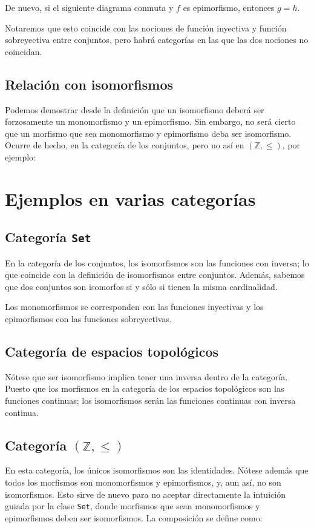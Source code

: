 \documentclass[11pt, fleqn, spanish]{book}
\begin{document}
De nuevo, si el siguiente diagrama conmuta y $f$ es epimorfismo, entonces $g=h$.

\begin{center}
\end{center}

Notaremos que esto coincide con las nociones de función inyectiva y
función sobreyectiva entre conjuntos, pero habrá categorías en las que
las dos nociones no coincidan.

\subsection{Relación con isomorfismos}
Podemos demostrar desde la definición que un isomorfismo deberá ser
forzosamente un monomorfismo y un epimorfismo. Sin embargo, no será
cierto que un morfismo que sea monomorfismo y epimorfismo deba ser
isomorfismo. Ocurre de hecho, en la categoría de los conjuntos,
pero no así en $(\mathbb{Z},\leq)$, por ejemplo:


\section {Ejemplos en varias categorías}
\subsection{Categoría \texttt{Set}}
En la categoría de los conjuntos, los isomorfismos son las funciones
con inversa; lo que coincide con la definición de isomorfismos entre
conjuntos. Además, sabemos que dos conjuntos son isomorfos si y sólo
si tienen la misma cardinalidad.

Los monomorfismos se corresponden con las funciones
inyectivas y los epimorfismos con las funciones sobreyectivas.

\subsection{Categoría de espacios topológicos}
Nótese que ser isomorfismo implica tener una inversa dentro de la
categoría. Puesto que los morfismos en la categoría de los espacios
topológicos son las funciones continuas; los isomorfismos serán las
funciones continuas con inversa continua.

\subsection{Categoría \texttt{$(\mathbb{Z},\leq)$}}
En esta categoría, los únicos isomorfismos son las identidades. Nótese
además que todos los morfismos son monomorfismos y epimorfismos, y,
aun así, no son isomorfismos. Esto sirve de nuevo para no aceptar
directamente la intuición guiada por la clase \texttt{Set}, donde
morfismos que sean monomorfismos y epimorfismos deben ser
isomorfismos. La composición se define como:
\end{document}
